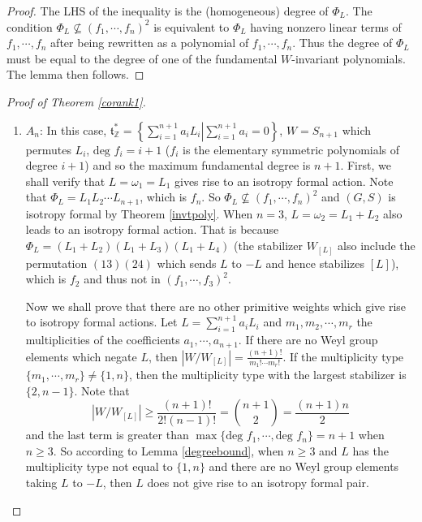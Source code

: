 \documentclass[11pt]{amsart}
\theoremstyle{plain}
\theoremstyle{definition}
\begin{document}
\begin{proof}
	The LHS of the inequality is the (homogeneous) degree of $\Phi_L$. The condition $\Phi_L\nsubseteq (f_1, \cdots, f_n)^2$ is equivalent to $\Phi_L$ having nonzero linear terms of $f_1, \cdots, f_n$ after being rewritten as a polynomial of $f_1, \cdots, f_n$. Thus the degree of $\Phi_L$ must be equal to the degree of one of the fundamental $W$-invariant polynomials. The lemma then follows.
\end{proof}
\begin{proof}[Proof of Theorem \ref{corank1}]
	\begin{enumerate}
		\item $A_n$: In this case, $\displaystyle \mathfrak{t}^*_\mathbb{Z}=\left.\left\{\sum_{i=1}^{n+1}a_i L_i\right| \sum_{i=1}^{n+1}a_i=0\right\}$, $W=S_{n+1}$ which permutes $L_i$, $\text{deg }f_i=i+1$ ($f_i$ is the elementary symmetric polynomials of degree $i+1$) and so the maximum fundamental degree is $n+1$. First, we shall verify that $L=\omega_1=L_1$ gives rise to an isotropy formal action. Note that $\Phi_L=L_1L_2\cdots L_{n+1}$, which is $f_n$. So $\Phi_L\nsubseteq (f_1, \cdots, f_n)^2$ and $(G, S)$ is isotropy formal by Theorem \ref{invtpoly}. When $n=3$, $L=\omega_2=L_1+L_2$ also leads to an isotropy formal action. That is because $\Phi_L=(L_1+L_2)(L_1+L_3)(L_1+L_4)$ (the stabilizer $W_{[L]}$ also include the permutation $(13)(24)$ which sends $L$ to $-L$ and hence stabilizes $[L]$), which is $f_2$ and thus not in $(f_1, \cdots, f_3)^2$.
		
		Now we shall prove that there are no other primitive weights which give rise to isotropy formal actions. Let $\displaystyle L=\sum_{i=1}^{n+1}a_i L_i$ and $m_1, m_2, \cdots, m_r$ the multiplicities of the coefficients $a_1, \cdots, a_{n+1}$. If there are no Weyl group elements which negate $L$, then $\displaystyle |W/W_{[L]}|=\frac{(n+1)!}{m_1!\cdots m_r!}$. If the multiplicity type $\{m_1, \cdots, m_r\}\neq \{1, n\}$, then the multiplicity type with the largest stabilizer is $\{2, n-1\}$. Note that
		\[|W/W_{[L]}|\geq \frac{(n+1)!}{2!(n-1)!}=\binom{n+1}{2}=\frac{(n+1)n}{2}\]
	and the last term is greater than $\max\{\text{deg }f_1, \cdots, \text{deg }f_n\}=n+1$ when $n\geq 3$. So according to Lemma \ref{degreebound}, when $n\geq 3$ and $L$ has the multiplicity type not equal to $\{1, n\}$ and there are no Weyl group elements taking $L$ to $-L$, then $L$ does not give rise to an isotropy formal pair.
		

\end{enumerate}
\end{proof}
\end{document}
